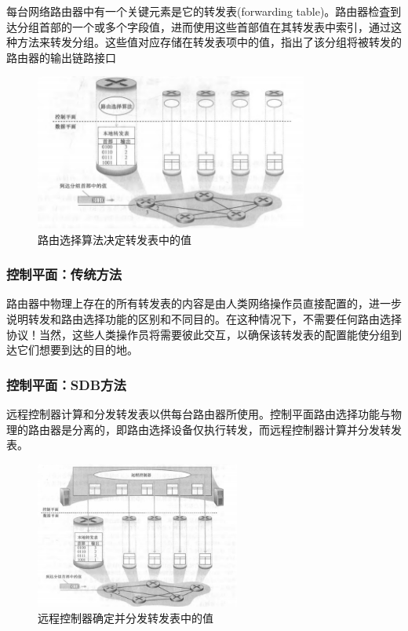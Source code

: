     每台网络路由器中有一个关键元素是它的转发表(forwarding table)。路由器检査到达分组首部的一个或多个字段值，进而使用这些首部值在其转发表中索引，通过这种方法来转发分组。这些值对应存储在转发表项中的值，指出了该分组将被转发的路由器的输出链路接口

\begin{figure}[!htbp]
    \centering
    \includegraphics[width=0.8\textwidth]{image/chapter04/路由选择算法.png}
    \caption{路由选择算法决定转发表中的值}
\end{figure}

\subsubsection{控制平面：传统方法}

    路由器中物理上存在的所有转发表的内容是由人类网络操作员直接配置的，进一步说明转发和路由选择功能的区别和不同目的。在这种情况下，不需要任何路由选择协议！当然，这些人类操作员将需要彼此交互，以确保该转发表的配置能使分组到达它们想要到达的目的地。

\subsubsection{控制平面：SDB方法}

    远程控制器计算和分发转发表以供每台路由器所使用。控制平面路由选择功能与物理的路由器是分离的，即路由选择设备仅执行转发，而远程控制器计算并分发转发表。

\begin{figure}[!htbp]
    \centering
    \includegraphics[width=0.6\textwidth]{image/chapter04/远程控制器决定转发表.png}
    \caption{远程控制器确定并分发转发表中的值}
\end{figure}

